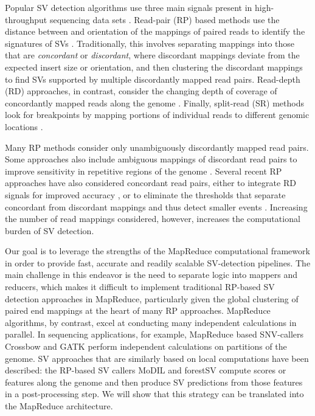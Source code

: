 \documentclass[11pt]{article}
\begin{document}
Popular SV detection algorithms use three main signals present in high-throughput sequencing data sets \textcite{Alkan:2011p547}. Read-pair (RP) based methods use the distance between and orientation of the mappings of paired reads to identify the signatures of SVs \autocite{Campbell:2008p539,Chen:2009p3,Hormozdiari:2009p284,Sindi:2009gu,Korbel:2009dy}. Traditionally, this involves separating mappings into those that are \emph{concordant} or \emph{discordant}, where discordant mappings deviate from the expected insert size or orientation, and then clustering the discordant mappings to find SVs supported by multiple discordantly mapped read pairs. Read-depth (RD) approaches, in contrast, consider the changing depth of coverage of concordantly mapped reads along the genome \autocite{Abyzov:2011bk,Alkan:2009cr,Yoon:2009kb,Chiang:2009di}. Finally, split-read (SR) methods look for breakpoints by mapping portions of individual reads to different genomic locations \autocite{Wang:2011p1607,Ye:2009p2}.

Many RP methods consider only unambiguously discordantly mapped read pairs. Some approaches also include ambiguous mappings of discordant read pairs to improve sensitivity in repetitive regions of the genome \autocite{Hormozdiari:2009p284,Quinlan:2010gf}. Several recent RP approaches have also considered concordant read pairs, either to integrate RD signals for improved accuracy \autocite{Sindi:2012kk,Michaelson:2012fj,Chiara:2012ey}, or to eliminate the thresholds that separate concordant from discordant mappings and thus detect smaller events \autocite{Marschall:2012ek}. Increasing the number of read mappings considered, however, increases the computational burden of SV detection. 

Our goal is to leverage the strengths of the MapReduce computational framework in order to provide fast, accurate and readily scalable SV-detection pipelines. The main challenge in this endeavor is the need to separate logic into mappers and reducers, which makes it difficult to implement traditional RP-based SV detection approaches in MapReduce, particularly given the global clustering of paired end mappings at the heart of many RP approaches. MapReduce algorithms, by contrast, excel at conducting many independent calculations in parallel. In sequencing applications, for example, MapReduce based SNV-callers Crossbow \autocite{Langmead:2009p1225} and GATK \autocite{McKenna:2010p1051} perform independent calculations on partitions of the genome. SV approaches that are similarly based on local computations have been described: the RP-based SV callers MoDIL \autocite{Lee:2009da} and forestSV \autocite{Michaelson:2012fj} compute scores or features along the genome and then produce SV predictions from those features in a post-processing step. We will show that this strategy can be translated into the MapReduce architecture.
\end{document}

